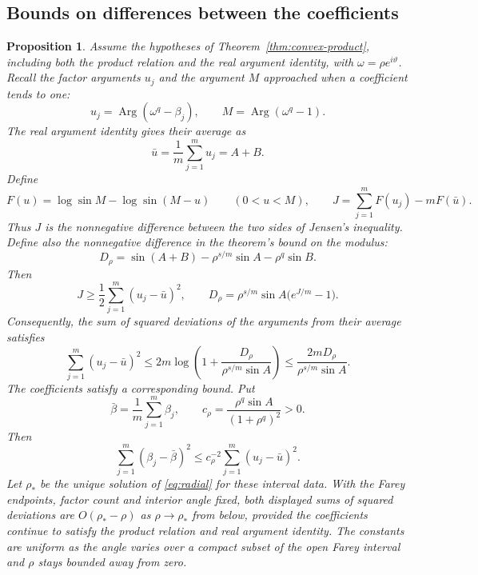 \documentclass[11pt,a4paper]{article}
\newtheorem{proposition}[theorem]{Proposition}
\theoremstyle{definition}
\theoremstyle{remark}
\numberwithin{equation}{section}
\begin{document}
\subsection{Bounds on differences between the coefficients}

\begin{proposition}\label{prop:quantitative-rigidity}
Assume the hypotheses of Theorem~\ref{thm:convex-product}, including both the product relation and the real argument identity, with $\omega=\rho e^{i\vartheta}$. Recall the factor arguments $u_j$ and the argument $M$ approached when a coefficient tends to one:
\[
 u_j=\operatorname{Arg}(\omega^q-\beta_j),\qquad
 M=\operatorname{Arg}(\omega^q-1).
\]
The real argument identity gives their average as
\[
 \bar u=\frac1m\sum_{j=1}^m u_j=A+B.
\]
Define
\[
 F(u)=\log\sin M-\log\sin(M-u)\qquad(0<u<M),
 \qquad J=\sum_{j=1}^mF(u_j)-mF(\bar u).
\]
Thus $J$ is the nonnegative difference between the two sides of Jensen's inequality. Define also the nonnegative difference in the theorem's bound on the modulus:
\[
 D_\rho=\sin(A+B)-\rho^{s/m}\sin A-\rho^q\sin B.
\]
Then
\begin{equation}\label{eq:jensen-gap}
 J\ge\frac12\sum_{j=1}^m(u_j-\bar u)^2,
 \qquad
 D_\rho=\rho^{s/m}\sin A\bigl(e^{J/m}-1\bigr).
\end{equation}
Consequently, the sum of squared deviations of the arguments from their average satisfies
\begin{equation}\label{eq:argument-variance-bound}
 \sum_{j=1}^m(u_j-\bar u)^2
 \le2m\log\left(1+\frac{D_\rho}{\rho^{s/m}\sin A}\right)
 \le\frac{2mD_\rho}{\rho^{s/m}\sin A}.
\end{equation}
The coefficients satisfy a corresponding bound. Put
\[
 \bar\beta=\frac1m\sum_{j=1}^m\beta_j,
 \qquad c_\rho=\frac{\rho^q\sin A}{(1+\rho^q)^2}>0.
\]
Then
\begin{equation}\label{eq:coefficient-variance-bound}
 \sum_{j=1}^m(\beta_j-\bar\beta)^2
 \le c_\rho^{-2}\sum_{j=1}^m(u_j-\bar u)^2.
\end{equation}
Let $\rho_*$ be the unique solution of \eqref{eq:radial} for these interval data. With the Farey endpoints, factor count and interior angle fixed, both displayed sums of squared deviations are $O(\rho_*-\rho)$ as $\rho\to\rho_*$ from below, provided the coefficients continue to satisfy the product relation and real argument identity. The constants are uniform as the angle varies over a compact subset of the open Farey interval and $\rho$ stays bounded away from zero.
\end{proposition}
\end{document}

